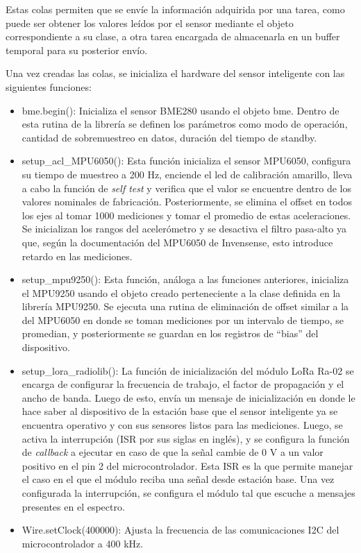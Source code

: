 Estas colas permiten que se envíe la información adquirida por una tarea, como puede ser obtener los valores leídos por el sensor mediante el objeto correspondiente a su clase, a otra tarea encargada de almacenarla en un buffer temporal para su posterior envío.

Una vez creadas las colas, se inicializa el hardware del sensor inteligente con las siguientes funciones:
\begin{itemize}
    
    \item bme.begin(): Inicializa el sensor BME280 usando el objeto bme. Dentro de esta rutina de la librería se definen los parámetros como modo de operación, cantidad de sobremuestreo en datos, duración del tiempo de standby.
    \item setup\_acl\_MPU6050(): Esta función inicializa el sensor MPU6050, configura su tiempo de muestreo a 200 Hz, enciende el led de calibración amarillo, lleva a cabo la función de \textit{self test} y verifica que el valor se encuentre dentro de los valores nominales de fabricación. Posteriormente, se elimina el offset en todos los ejes al tomar 1000 mediciones y tomar el promedio de estas aceleraciones. Se inicializan los rangos del acelerómetro y se desactiva el filtro pasa-alto ya que, según la documentación del MPU6050 de Invensense, esto introduce retardo en las mediciones.
    \item setup\_mpu9250(): Esta función, análoga a las funciones anteriores, inicializa el MPU9250 usando el objeto creado perteneciente a la clase definida en la librería MPU9250. Se ejecuta una rutina de eliminación de offset similar a la del MPU6050 en donde se toman mediciones por un intervalo de tiempo, se promedian, y posteriormente se guardan en los registros de ``bias'' del dispositivo.
    \item setup\_lora\_radiolib(): La función de inicialización del módulo LoRa Ra-02 se encarga de configurar la frecuencia de trabajo, el factor de propagación y el ancho de banda. Luego de esto, envía un mensaje de inicialización en donde le hace saber al dispositivo de la estación base que el sensor inteligente ya se encuentra operativo y con sus sensores listos para las mediciones. Luego, se activa la interrupción (ISR por sus siglas en inglés), y se configura la función de \textit{callback} a ejecutar en caso de que la señal cambie de 0 V a un valor positivo en el pin 2 del microcontrolador. Esta ISR es la que permite manejar el caso en el que el módulo reciba una señal desde estación base. Una vez configurada la interrupción, se configura el módulo tal que escuche a mensajes presentes en el espectro.
    \item Wire.setClock(400000): Ajusta la frecuencia de las comunicaciones I2C del microcontrolador a 400 kHz.
\end{itemize}

